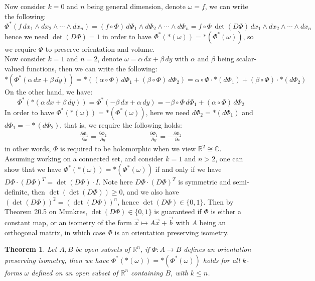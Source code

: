 \documentclass[11pt,oneside]{book}
\theoremstyle{break}
\theoremstyle{break}
\newtheorem{thm}{Theorem}[section]
\newcommand{\R}{\mathbb{R}}
\newcommand{\Complex}{\mathbb{C}}
\begin{document}
Now consider $k=0$ and $n$ being general dimension, denote $\omega = f$, we can write the following: 
$$\Phi^*(f\, dx_1 \wedge dx_2 \wedge \cdots \wedge dx_n) = (f\circ \Phi)\, d\Phi_1 \wedge d\Phi_2 \wedge \cdots \wedge d\Phi_n = f\circ \Phi \,\det(D\Phi) \, dx_1 \wedge dx_2 \wedge \cdots \wedge dx_n$$ 
hence we need $\det(D\Phi) = 1$ in order to have $\Phi^*(*(\omega)) = *(\Phi^*(\omega))$, so we require $\Phi$ to preserve orientation and volume.\\

Now consider $k=1$ and $n=2$, denote $\omega = \alpha \, dx + \beta \, dy$ with $\alpha$ and $\beta$ being scalar-valued functions, then we can write the following: $$*(\Phi^*(\alpha\, dx + \beta \, dy)) = *((\alpha\circ \Phi)\, d\Phi_1 + (\beta \circ \Phi)\, d\Phi_2) = \alpha \circ \Phi \cdot *(d\Phi_1) + (\beta \circ \Phi) \cdot *(d\Phi_2)$$
On the other hand, we have:
$$\Phi^*(*(\alpha\, dx +\beta \, dy) ) = \Phi^*(-\beta \, dx+\alpha\, dy) = -\beta \circ \Phi \, d\Phi_1 + (\alpha \circ \Phi)\, d\Phi_2$$
In order to have  $\Phi^*(*(\omega)) = *(\Phi^*(\omega))$, here we need $d\Phi_2 = *(d\Phi_1)$ and $d\Phi_1 = -*(d\Phi_2)$, that is, we require the following holds:
\begin{align*}
\frac{\partial\Phi_1}{\partial x} = \frac{\partial \Phi_2}{\partial y} \qquad\qquad\qquad \frac{\partial \Phi_1}{\partial y} = -\frac{\partial \Phi_2}{\partial x}
\end{align*}
in other words, $\Phi$ is required to be holomorphic when we view $\R^2  \cong \Complex$.\\


Assuming working on a connected set, and consider $k=1$ and $n>2$, one can show that we have $\Phi^*(*(\omega)) = *(\Phi^*(\omega))$ if and only if we have $D\Phi \cdot (D\Phi)^T = \det(D\Phi) \cdot I$. Note here $D\Phi \cdot (D\Phi)^T$ is symmetric and semi-definite, then $\det(\det(D\Phi)) \geq 0$, and we also have $(\det(D\Phi))^2= (\det(D\Phi))^n$, hence $\det(D\Phi) \in \{0,1\}$. Then by Theorem 20.5 on Munkres, $\det(D\Phi) \in \{0,1\}$ is guaranteed if $\Phi $ is either a constant map, or an isometry of the form $\vec{x}\mapsto A \vec{x}+ \vec{b}$ with $A$ being an orthogonal matrix, in which case $\Phi$ is an orientation preserving isometry. 

\begin{thm}
Let $A, B$ be open subsets of $\R^n$, if $\Phi:A \to B$ defines an orientation preserving isometry, then we have $\Phi^*(*(\omega)) = *(\Phi^*(\omega))$ holds for all $k$-forms $\omega$ defined on an open subset of $\R^n$ containing $B$, with $k\leq n$.
\end{thm}
\end{document}

